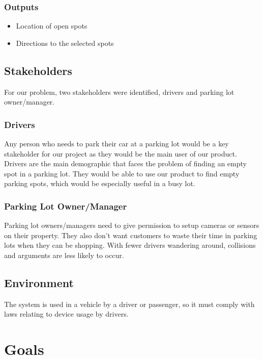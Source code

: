 \documentclass[12pt,letterpaper]{article}
\begin{document}
\subsubsection{Outputs}
\begin{itemize}
    \item Location of open spots
    \item Directions to the selected spots
\end{itemize}

\subsection{Stakeholders}
For our problem, two stakeholders were identified, drivers and parking lot
owner/manager.

\subsubsection{Drivers}
Any person who needs to park their car at a parking lot would be a key
stakeholder for our project as they would be the main user of our product.
Drivers are the main demographic that faces the problem of finding an empty spot
in a parking lot. They would be able to use our product to find empty parking
spots, which would be especially useful in a busy lot.

\subsubsection{Parking Lot Owner/Manager}
Parking lot owners/managers need to give permission to setup cameras or sensors
on their property. They also don't want customers to waste their time in parking
lots when they can be shopping. With fewer drivers wandering around, collisions
and arguments are less likely to occur.
\subsection{Environment}
The system is used in a vehicle by a driver or passenger, so it must comply with
laws relating to device usage by drivers.

\newpage

\section{Goals}
\end{document}
